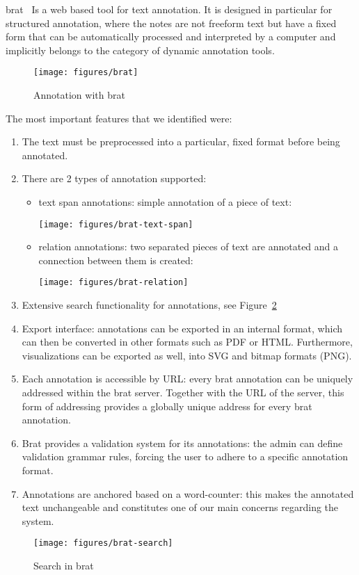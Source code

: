 brat~\cite{brat:on} Is a web based tool for text annotation. It is designed in particular
for structured annotation, where the notes are not freeform text but have a fixed form
that can be automatically processed and interpreted by a computer and implicitly belongs
to the category of dynamic annotation tools.
\begin{figure}[ht]
 \texttt{[image: figures/brat]}
 \caption{Annotation with brat}\label{fig:brat}
\end{figure}
The most important features that we identified were:
\begin{enumerate}
\item The text must be preprocessed into a particular, fixed format before being
  annotated.
\item There are 2 types of annotation supported:
  \begin{itemize}
  \item text span annotations: simple annotation of a piece of text:
   \begin{center}
     \texttt{[image: figures/brat-text-span]}
   \end{center}
   
  \item relation annotations: two separated pieces of text are annotated and a connection between them is created:
    \begin{center}\texttt{[image: figures/brat-relation]}\end{center}
  \end{itemize}
\item Extensive search functionality for annotations, see Figure~\ref{fig:brat-search}
\item Export interface: annotations can be exported in an internal format, which can then
  be converted in other formats such as PDF or HTML. Furthermore, visualizations can be
  exported as well, into SVG and bitmap formats (PNG).
\item Each annotation is accessible by URL: every brat annotation can be uniquely
  addressed within the brat server. Together with the URL of the server, this form of
  addressing provides a globally unique address for every brat annotation.
\item Brat provides a validation system for its annotations: the admin can define
  validation grammar rules, forcing the user to adhere to a specific annotation format.
\item Annotations are anchored based on a word-counter: this makes the annotated text
  unchangeable and constitutes one of our main concerns regarding the system.
\end{enumerate}
\begin{figure}[ht]
  \texttt{[image: figures/brat-search]}
  \caption{Search in brat}\label{fig:brat-search}
\end{figure}


